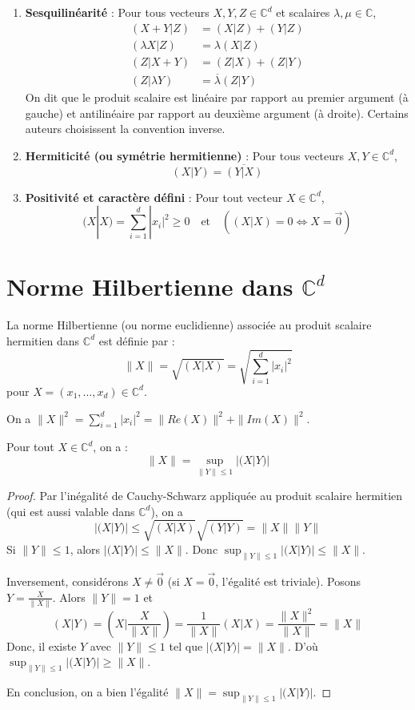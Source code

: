 \begin{enumerate}
    \item \textbf{Sesquilinéarité} :
    Pour tous vecteurs $X, Y, Z \in \mathbb{C}^d$ et scalaires $\lambda, \mu \in \mathbb{C}$,
    \begin{align*}
        (X + Y|Z) &= (X|Z) + (Y|Z) \\
        (\lambda X|Z) &= \lambda (X|Z) \\
        (Z|X + Y) &= (Z|X) + (Z|Y) \\
        (Z|\lambda Y) &= \overline{\lambda} (Z|Y)
    \end{align*}
    On dit que le produit scalaire est linéaire par rapport au premier argument (à gauche) et antilinéaire par rapport au deuxième argument (à droite). Certains auteurs choisissent la convention inverse.

    \item \textbf{Hermiticité (ou symétrie hermitienne)} :
    Pour tous vecteurs $X, Y \in \mathbb{C}^d$,
    \[
    (X|Y) = \overline{(Y|X)}
    \]

    \item \textbf{Positivité et caractère défini} :
    Pour tout vecteur $X \in \mathbb{C}^d$,
    \[
    (X|X) = \sum_{i=1}^d |x_i|^2 \geq 0 \quad \text{et} \quad ((X|X) = 0 \iff X = \overrightarrow{0})
    \]
\end{enumerate}


\section{Norme Hilbertienne dans $\mathbb{C}^d$}

\begin{definition}
La norme Hilbertienne (ou norme euclidienne) associée au produit scalaire hermitien dans $\mathbb{C}^d$ est définie par :
\[
\|X\| = \sqrt{(X|X)} = \sqrt{\sum_{i=1}^d |x_i|^2}
\]
pour $X = (x_1, \ldots, x_d) \in \mathbb{C}^d$.
\end{definition}
On a $\|X\|^2 = \sum_{i=1}^d |x_i|^2 = \|Re(X)\|^2 + \|Im(X)\|^2$.

\begin{lemma}
Pour tout $X \in \mathbb{C}^d$, on a :
\[
\|X\| = \sup_{\|Y\| \leq 1} |(X|Y)|
\]
\end{lemma}

\begin{proof}
Par l'inégalité de Cauchy-Schwarz appliquée au produit scalaire hermitien (qui est aussi valable dans $\mathbb{C}^d$), on a
\[
|(X|Y)| \leq \sqrt{(X|X)} \sqrt{(Y|Y)} = \|X\| \|Y\|
\]
Si $\|Y\| \leq 1$, alors $|(X|Y)| \leq \|X\|$. Donc $\sup_{\|Y\| \leq 1} |(X|Y)| \leq \|X\|$.

Inversement, considérons $X \neq \overrightarrow{0}$ (si $X = \overrightarrow{0}$, l'égalité est triviale). Posons $Y = \frac{X}{\|X\|}$. Alors $\|Y\| = 1$ et
\[
(X|Y) = \left(X \Big| \frac{X}{\|X\|} \right) = \frac{1}{\|X\|} (X|X) = \frac{\|X\|^2}{\|X\|} = \|X\|
\]
Donc, il existe $Y$ avec $\|Y\| \leq 1$ tel que $|(X|Y)| = \|X\|$. D'où $\sup_{\|Y\| \leq 1} |(X|Y)| \geq \|X\|$.

En conclusion, on a bien l'égalité $\|X\| = \sup_{\|Y\| \leq 1} |(X|Y)|$.
\end{proof}

